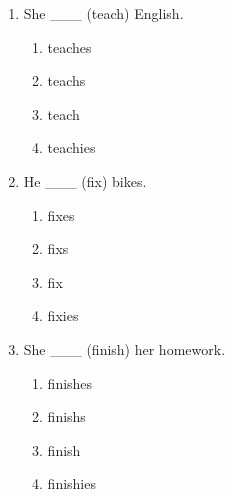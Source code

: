 \documentclass[11pt,a4paper]{ctexart}
\begin{document}
\begin{enumerate}[leftmargin=*,itemsep=4pt]
\item She \_\_\_ (teach) English.
\begin{enumerate}[label=\Alph*.,leftmargin=2em,itemsep=1pt,topsep=2pt]
\item teaches
\item teachs
\item teach
\item teachies
\end{enumerate}
\item He \_\_\_ (fix) bikes.
\begin{enumerate}[label=\Alph*.,leftmargin=2em,itemsep=1pt,topsep=2pt]
\item fixes
\item fixs
\item fix
\item fixies
\end{enumerate}
\item She \_\_\_ (finish) her homework.
\begin{enumerate}[label=\Alph*.,leftmargin=2em,itemsep=1pt,topsep=2pt]
\item finishes
\item finishs
\item finish
\item finishies
\end{enumerate}
\end{enumerate}
\end{document}
